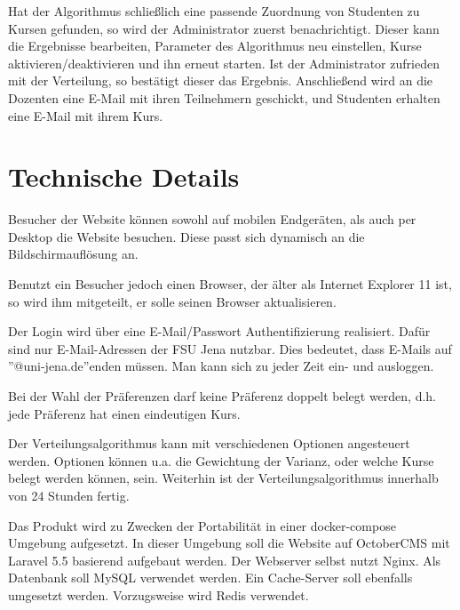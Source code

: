 		Hat der Algorithmus schließlich eine passende Zuordnung von Studenten zu Kursen gefunden, so wird der Administrator zuerst benachrichtigt.
		Dieser kann die Ergebnisse bearbeiten, Parameter des Algorithmus neu einstellen, Kurse aktivieren/deaktivieren und ihn erneut starten.
		Ist der Administrator zufrieden mit der Verteilung, so bestätigt dieser das Ergebnis.
		Anschließend wird an die Dozenten eine E-Mail mit ihren Teilnehmern geschickt, und Studenten erhalten eine E-Mail mit ihrem Kurs.
		
	\section{Technische Details}
		
		Besucher der Website können sowohl auf mobilen Endgeräten, als auch per Desktop die Website besuchen.
		Diese passt sich dynamisch an die Bildschirmauflösung an.\newline
		
		Benutzt ein Besucher jedoch einen Browser, der älter als Internet Explorer 11 ist, so wird ihm mitgeteilt, er solle seinen Browser aktualisieren.
		
		Der Login wird über eine E-Mail/Passwort Authentifizierung realisiert.
		Dafür sind nur E-Mail-Adressen der FSU Jena nutzbar.
		Dies bedeutet, dass E-Mails auf ''@uni-jena.de''enden müssen.
		Man kann sich zu jeder Zeit ein- und ausloggen.\newline
		
		Bei der Wahl der Präferenzen darf keine Präferenz doppelt belegt werden, d.h. jede Präferenz hat einen eindeutigen Kurs. \newline
		
		Der Verteilungsalgorithmus kann mit verschiedenen Optionen angesteuert werden. Optionen können u.a. die Gewichtung der Varianz, oder welche Kurse belegt werden können, sein. Weiterhin ist der Verteilungsalgorithmus innerhalb von 24 Stunden fertig. \newline
		
		Das Produkt wird zu Zwecken der Portabilität in einer docker-compose Umgebung aufgesetzt.
		In dieser Umgebung soll die Website auf OctoberCMS mit Laravel 5.5 basierend aufgebaut werden.
		Der Webserver selbst nutzt Nginx.
		Als Datenbank soll MySQL verwendet werden.
		Ein Cache-Server soll ebenfalls umgesetzt werden.
		Vorzugsweise wird Redis verwendet.\newline
		
